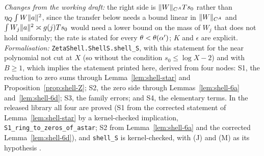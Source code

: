 \emph{Changes from the working draft:} the right side is $\lVert W\rVert_{C^A}Ts_0$ rather than $\eta_Q\int W\lVert a\rVert^2$, since the transfer below needs a bound
linear in $\lVert W\rVert_{C^A}$ and $\int W_j\lVert a\rVert^2\asymp g(j)Ts_0$ would need a lower bound on the mass of $W_j$ that does not hold uniformly; the rate is stated for every
$\theta<\theta(\alpha')$; $K$ and $\epsilon$ are explicit. \emph{Formalisation:} \texttt{ZetaShell.ShellS.shell\_S}, with this statement for the near
polynomial not cut at $X$ (so without the condition $s_0\le\log X-2$) and with $B\ge1$, which implies the statement printed here, derived from four
nodes: S1, the reduction to zero sums through Lemma~\ref{lem:shell-star} and Proposition~\ref{prop:shell-Z}; S2, the zero side through
Lemmas~\ref{lem:shell-6a} and~\ref{lem:shell-6d}; S3, the family errors; and S4, the elementary terms. In the released library all four are proved (S1
from the corrected statement of Lemma~\ref{lem:shell-star} by a kernel-checked implication, \texttt{S1\_ring\_to\_zeros\_of\_astar}; S2 from
Lemma~\ref{lem:shell-6a} and the corrected Lemma~\ref{lem:shell-6d}), and \texttt{shell\_S} is kernel-checked, with (J) and (M) as its hypothesis
\tagL.

